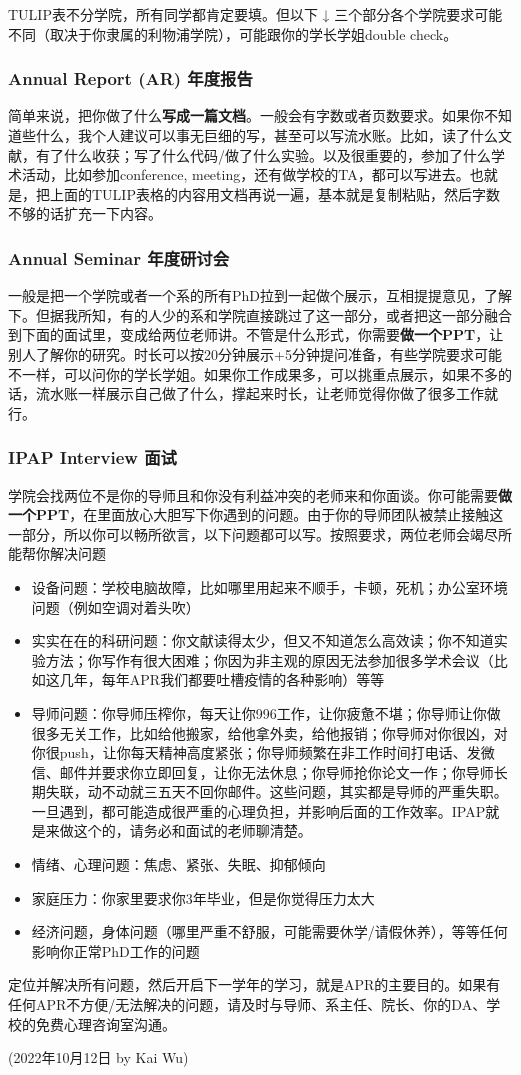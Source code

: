 TULIP表不分学院，所有同学都肯定要填。但以下 ↓ 三个部分各个学院要求可能不同（取决于你隶属的利物浦学院），可能跟你的学长学姐double check。

\subsubsection{Annual Report (AR) 年度报告}
简单来说，把你做了什么\textbf{写成一篇文档}。一般会有字数或者页数要求。如果你不知道些什么，我个人建议可以事无巨细的写，甚至可以写流水账。比如，读了什么文献，有了什么收获；写了什么代码/做了什么实验。以及很重要的，参加了什么学术活动，比如参加conference, meeting，还有做学校的TA，都可以写进去。也就是，把上面的TULIP表格的内容用文档再说一遍，基本就是复制粘贴，然后字数不够的话扩充一下内容。
\subsubsection{Annual Seminar 年度研讨会}
一般是把一个学院或者一个系的所有PhD拉到一起做个展示，互相提提意见，了解下。但据我所知，有的人少的系和学院直接跳过了这一部分，或者把这一部分融合到下面的面试里，变成给两位老师讲。不管是什么形式，你需要\textbf{做一个PPT}，让别人了解你的研究。时长可以按20分钟展示+5分钟提问准备，有些学院要求可能不一样，可以问你的学长学姐。如果你工作成果多，可以挑重点展示，如果不多的话，流水账一样展示自己做了什么，撑起来时长，让老师觉得你做了很多工作就行。
\subsubsection{IPAP Interview 面试}
学院会找两位不是你的导师且和你没有利益冲突的老师来和你面谈。你可能需要\textbf{做一个PPT}，在里面放心大胆写下你遇到的问题。由于你的导师团队被禁止接触这一部分，所以你可以畅所欲言，以下问题都可以写。按照要求，两位老师会竭尽所能帮你解决问题
\begin{itemize}
    \item 设备问题：学校电脑故障，比如哪里用起来不顺手，卡顿，死机；办公室环境问题（例如空调对着头吹）
    \item 实实在在的科研问题：你文献读得太少，但又不知道怎么高效读；你不知道实验方法；你写作有很大困难；你因为非主观的原因无法参加很多学术会议（比如这几年，每年APR我们都要吐槽疫情的各种影响）等等
    \item 导师问题：你导师压榨你，每天让你996工作，让你疲惫不堪；你导师让你做很多无关工作，比如给他搬家，给他拿外卖，给他报销；你导师对你很凶，对你很push，让你每天精神高度紧张；你导师频繁在非工作时间打电话、发微信、邮件并要求你立即回复，让你无法休息；你导师抢你论文一作；你导师长期失联，动不动就三五天不回你邮件。这些问题，其实都是导师的严重失职。一旦遇到，都可能造成很严重的心理负担，并影响后面的工作效率。IPAP就是来做这个的，请务必和面试的老师聊清楚。
    \item 情绪、心理问题：焦虑、紧张、失眠、抑郁倾向
    \item 家庭压力：你家里要求你3年毕业，但是你觉得压力太大
    \item 经济问题，身体问题（哪里严重不舒服，可能需要休学/请假休养），等等任何影响你正常PhD工作的问题
\end{itemize}

\vspace{5mm}
定位并解决所有问题，然后开启下一学年的学习，就是APR的主要目的。如果有任何APR不方便/无法解决的问题，请及时与导师、系主任、院长、你的DA、学校的免费心理咨询室沟通。


\begin{flushright}
(2022年10月12日 by Kai Wu)
\end{flushright}